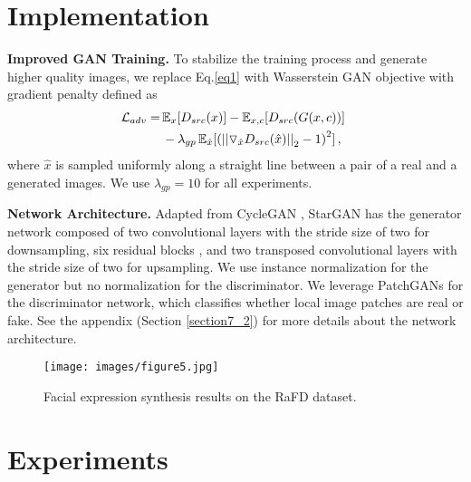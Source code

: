 \documentclass[10pt,twocolumn,letterpaper]{article}
\begin{document}
\section{Implementation} \label{implementation}

\noindent \textbf{Improved GAN Training.}
To stabilize the training process and generate higher quality images, we replace Eq.\thinspace\eqref{eq1} with Wasserstein GAN objective with gradient penalty \cite{arjovsky2017wasserstein,gulrajani2017improved} defined as
\begin{equation}
\begin{split}
\mathcal{L}_{adv} = \thinspace & {\mathbb{E}}_{x}[{D}_{src}(x)] - {\mathbb{E}}_{x, c}[{D}_{src}(G(x, c))] \thinspace \thinspace\\  
& - {\lambda}_{gp} \thinspace {\mathbb{E}}_{\hat{x}}[{{(||{\triangledown}_{\hat{x}} {D}_{src}(\hat{x})||}_{2} - 1)}^{2}] \thinspace,
\end{split}
\end{equation}
where $\hat{x}$ is sampled uniformly along a straight line between a pair of a real and a generated images. We use ${\lambda}_{gp} = 10$ for all experiments.

\medskip

\noindent \textbf{Network Architecture.}
Adapted from CycleGAN \cite{zhu2017unpaired}, StarGAN has the generator network composed of two convolutional layers with the stride size of two for downsampling, six residual blocks \cite{he2016deep}, and two transposed convolutional layers with the stride size of two for upsampling. We use instance normalization \cite{ulyanov2016instance} for the generator but no normalization for the discriminator. We leverage PatchGANs \cite{Isola_2017_CVPR,li2016precomputed,zhu2017unpaired} for the discriminator network, which classifies whether local image patches are real or fake. See the appendix (Section \ref{section7_2}) for more details about the network architecture.
\begin{figure*}[ht]
\centering
\centerline{\texttt{[image: images/figure5.jpg]}}
\caption{Facial expression synthesis results on the RaFD dataset.}
\label{qual_rafd}
\vspace{-0.1in}  
\end{figure*}

\section{Experiments} \label{experiments}
\end{document}
